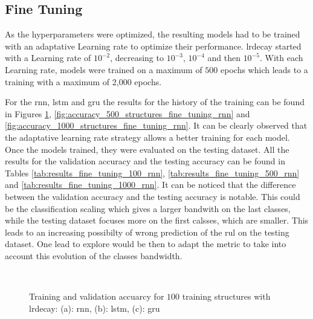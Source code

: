 \documentclass[conference]{IEEEtran}
\begin{document}
\subsection{Fine Tuning}

As the hyperparameters were optimized, the resulting models had to be trained with an adaptative Learning rate to optimize their performance. \gls{lrdecay} started with a Learning rate of $10^{-2}$, decreasing to $10^{-3}$, $10^{-4}$ and then $10^{-5}$. With each Learning rate, models were trained on a maximum of $500$ epochs which leads to a training with a maximum of 2,000 epochs. 


For the \gls{rnn}, \gls{lstm} and \gls{gru} the results for the history of the training can be found in Figures \ref{fig:accuracy_100_structures_fine_tuning_rnn}, \ref{fig:accuracy_500_structures_fine_tuning_rnn} and \ref{fig:accuracy_1000_structures_fine_tuning_rnn}. It can be clearly observed that the adaptative learning rate strategy allows a better training for each model. Once the models trained, they were evaluated on the testing dataset. All the results for the validation accuracy and the testing accuracy can be found in Tables \ref{tab:results_fine_tuning_100_rnn}, \ref{tab:results_fine_tuning_500_rnn} and \ref{tab:results_fine_tuning_1000_rnn}. It can be noticed that the difference between the validation accuracy and the testing accuracy is notable. This could be the classification scaling which gives a larger bandwith on the last classes, while the testing dataset focuses more on the first calsses, which are smaller. This leads to an increasing possibilty of wrong prediction of the \gls{rul} on the testing dataset. One lead to explore would be then to adapt the metric to take into account this evolution of the classes bandwidth.

\begin{figure}[htp]
	\centering
	\quad
	\\
	\caption{Training and validation accuarcy for $ 100 $ training structures with \gls{lrdecay}: (a): \gls{rnn}, (b): \gls{lstm}, (c): \gls{gru}}
	\label{fig:accuracy_100_structures_fine_tuning_rnn}
\end{figure}
\end{document}
